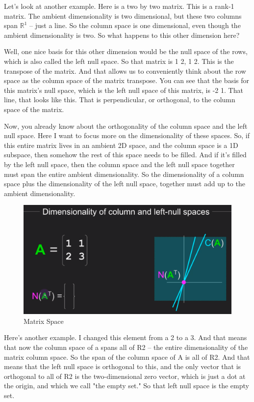 \documentclass[fleqn,10pt]{olplainarticle}
\theoremstyle{definition}
\theoremstyle{remark}
\begin{document}
Let's look at another example. Here is a two by two matrix. This is a rank-1 matrix. The ambient dimensionality is two dimensional, but these two columns span $\mathbb{R}^1$ -- just a line. So the column space is one dimensional, even though the ambient dimensionality is two. So what happens to this other dimension here?

Well, one nice basis for this other dimension would be the null space of the rows, which is also called the left null space. So that matrix is 1 2, 1 2. This is the transpose of the matrix. And that allows us to conveniently think about the row space as the column space of the matrix transpose. You can see that the basis for this matrix's null space, which is the left null space of this matrix, is -2 1. That line, that looks like this. That is perpendicular, or orthogonal, to the column space of the matrix.

Now, you already know about the orthogonality of the column space and the left null space. Here I want to focus more on the dimensionality of these spaces. So, if this entire matrix lives in an ambient 2D space, and the column space is a 1D subspace, then somehow the rest of this space needs to be filled. And if it's filled by the left null space, then the column space and the left null space together must span the entire ambient dimensionality. So the dimensionality of a column space plus the dimensionality of the left null space, together must add up to the ambient dimensionality.

\begin{figure}[ht]
	\centering
	\includegraphics[width=0.6\linewidth]{images/matrix-space-33.png}
	\caption{Matrix Space}
	\label{fig:matrix_space_33}
\end{figure}

Here's another example. I changed this element from a 2 to a 3. And that means that now the column space of a spans all of R2 -- the entire dimensionality of the matrix column space. So the span of the column space of A is all of R2. And that means that the left null space is orthogonal to this, and the only vector that is orthogonal to all of R2 is the two-dimensional zero vector, which is just a dot at the origin, and which we call "the empty set." So that left null space is the empty set.
\end{document}
